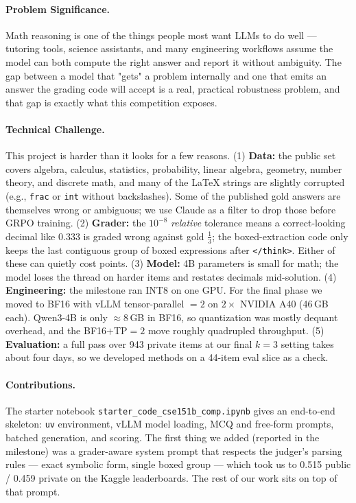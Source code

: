 \documentclass{article}
\begin{document}
\paragraph{Problem Significance.}
Math reasoning is one of the things people most want LLMs to do
well --- tutoring tools, science assistants, and many engineering
workflows assume the model can both compute the right answer and
report it without ambiguity. The gap between a model that "gets"
a problem internally and one that emits an answer the grading code
will accept is a real, practical robustness problem, and that gap
is exactly what this competition exposes.

\paragraph{Technical Challenge.}
This project is harder than it looks for a few reasons.
(1) \textbf{Data:} the public set covers algebra, calculus,
statistics, probability, linear algebra, geometry, number theory,
and discrete math, and many of the LaTeX strings are slightly
corrupted (e.g., \texttt{frac} or \texttt{int} without
backslashes). Some of the published gold answers are themselves
wrong or ambiguous; we use Claude as a filter to drop those before
GRPO training.
(2) \textbf{Grader:} the $10^{-8}$ \emph{relative} tolerance means
a correct-looking decimal like $0.333$ is graded wrong against
gold $\tfrac{1}{3}$; the boxed-extraction code only keeps the last
contiguous group of boxed expressions after \texttt{</think>}.
Either of these can quietly cost points.
(3) \textbf{Model:} 4B parameters is small for math; the model
loses the thread on harder items and restates decimals
mid-solution.
(4) \textbf{Engineering:} the milestone ran INT8 on one GPU. For
the final phase we moved to BF16 with vLLM tensor-parallel $=2$
on $2\times$ NVIDIA A40 (46\,GB each). Qwen3-4B is only $\approx
8$\,GB in BF16, so quantization was mostly dequant overhead, and
the BF16$+$TP$=2$ move roughly quadrupled throughput.
(5) \textbf{Evaluation:} a full pass over 943 private items at
our final $k=3$ setting takes about four days, so we developed
methods on a 44-item eval slice as a check.

\paragraph{Contributions.}
The starter notebook \texttt{starter\_code\_cse151b\_comp.ipynb}
gives an end-to-end skeleton: \texttt{uv} environment, vLLM model
loading, MCQ and free-form prompts, batched generation, and scoring.
The first thing we added (reported in the milestone) was a
grader-aware system prompt that respects the judger's parsing rules
--- exact symbolic form, single boxed group --- which took us to
0.515 public / 0.459 private on the Kaggle leaderboards. The rest
of our work sits on top of that prompt.
\end{document}
